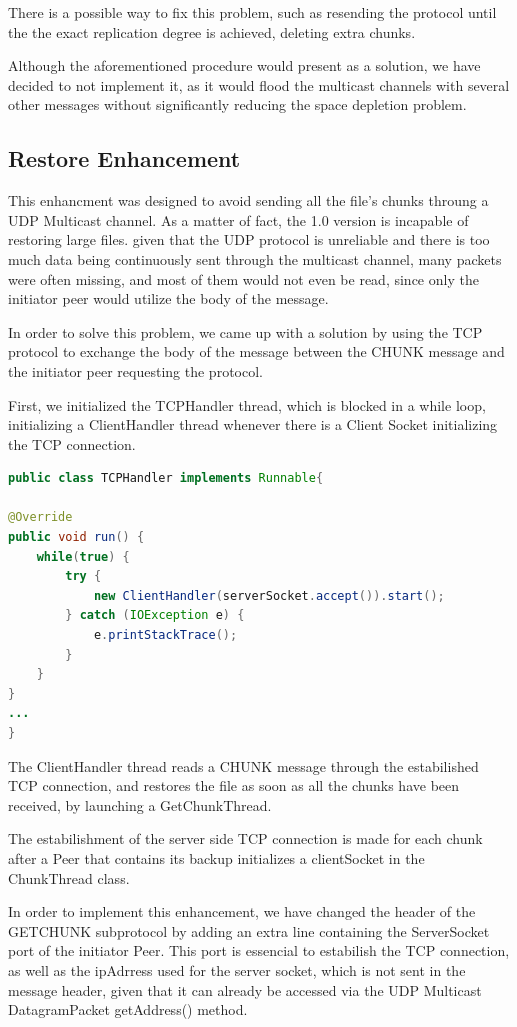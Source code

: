 \documentclass[11pt]{article}
\begin{document}
There is a possible way to fix this problem, such as resending the protocol until the the exact replication degree is achieved, deleting extra chunks.

Although the aforementioned procedure would present as a solution, we have decided to not implement it, 
as it would flood the multicast channels with several other messages without significantly reducing the space depletion problem.


\subsection{Restore Enhancement}

This enhancment was designed to avoid sending all the file's chunks throung a UDP Multicast channel. As a matter of fact, the 1.0 version is incapable of restoring large files.
given that the UDP protocol is unreliable and there is too much data being continuously sent through the multicast channel, many packets were often missing, and most of them would not even be read,
since only the initiator peer would utilize the body of the message.

In order to solve this problem, we came up with a solution by using the TCP protocol to exchange the body of the message between the CHUNK message and the initiator peer requesting the protocol.

First, we initialized the TCPHandler thread, which is blocked in a while loop, initializing a ClientHandler thread whenever there is a Client Socket initializing the TCP connection.

\begin{lstlisting}[language=java]
public class TCPHandler implements Runnable{

@Override
public void run() {
	while(true) {
		try {
			new ClientHandler(serverSocket.accept()).start();
		} catch (IOException e) {
			e.printStackTrace();
		}
	}
}
...
}
\end{lstlisting}

The ClientHandler thread reads a CHUNK message through the estabilished TCP connection, and restores the file as soon as all the chunks have been received, by launching a GetChunkThread.

The estabilishment of the server side TCP connection is made for each chunk after a Peer that contains its backup initializes a clientSocket in the ChunkThread class.

In order to implement this enhancement, we have changed the header of the GETCHUNK subprotocol by adding an extra line containing the ServerSocket port of the initiator Peer.
This port is essencial to estabilish the TCP connection, as well as the ipAdrress used for the server socket, which is not sent in the message header, given that it can already be accessed
via the UDP Multicast DatagramPacket getAddress() method.
\end{document}
